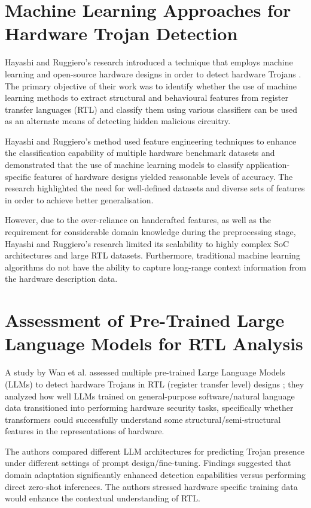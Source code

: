 \documentclass[12pt,a4paper]{report}
\begin{document}
\section{Machine Learning Approaches for Hardware Trojan Detection}

Hayashi and Ruggiero's research introduced a technique that employs machine learning and open-source hardware designs in order to detect hardware Trojans \cite{ref4}. The primary objective of their work was to identify whether the use of machine learning methods to extract structural and behavioural features from register transfer languages (RTL) and classify them using various classifiers can be used as an alternate means of detecting hidden malicious circuitry.

Hayashi and Ruggiero's method used feature engineering techniques to enhance the classification capability of multiple hardware benchmark datasets and demonstrated that the use of machine learning models to classify application-specific features of hardware designs yielded reasonable levels of accuracy. The research highlighted the need for well-defined datasets and diverse sets of features in order to achieve better generalisation.

However, due to the over-reliance on handcrafted features, as well as the requirement for considerable domain knowledge during the preprocessing stage, Hayashi and Ruggiero's research limited its scalability to highly complex SoC architectures and large RTL datasets. Furthermore, traditional machine learning algorithms do not have the ability to capture long-range context information from the hardware description data.

\section{Assessment of Pre-Trained Large Language Models for RTL Analysis}

A study by Wan et al. assessed multiple pre-trained Large Language Models (LLMs) to detect hardware Trojans in RTL (register transfer level) designs \cite{ref5}; they analyzed how well LLMs trained on general-purpose software/natural language data transitioned into performing hardware security tasks, specifically whether transformers could successfully understand some structural/semi-structural features in the representations of hardware.

The authors compared different LLM architectures for predicting Trojan presence under different settings of prompt design/fine-tuning. Findings suggested that domain adaptation significantly enhanced detection capabilities versus performing direct zero-shot inferences. The authors stressed hardware specific training data would enhance the contextual understanding of RTL.
\end{document}

